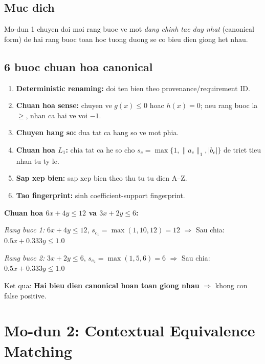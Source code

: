 \documentclass[11pt,a4paper]{article}
\begin{document}
\subsection{Muc dich}

Mo-dun 1 chuyen doi moi rang buoc ve mot \emph{dang chinh tac duy nhat}
(canonical form) de hai rang buoc toan hoc tuong duong se co bieu dien giong het nhau.

\subsection{6 buoc chuan hoa canonical}

\begin{enumerate}
  \item \textbf{Deterministic renaming:} doi ten bien theo provenance/requirement ID.
  \item \textbf{Chuan hoa sense:} chuyen ve $g(x) \leq 0$ hoac $h(x) = 0$;
        neu rang buoc la $\geq$, nhan ca hai ve voi $-1$.
  \item \textbf{Chuyen hang so:} dua tat ca hang so ve mot phia.
  \item \textbf{Chuan hoa $L_1$:} chia tat ca he so cho
        $s_c = \max\{1, \|a_c\|_1, |b_c|\}$ de triet tieu nhan tu ty le.
  \item \textbf{Sap xep bien:} sap xep bien theo thu tu tu dien A--Z.
  \item \textbf{Tao fingerprint:} sinh coefficient-support fingerprint.
\end{enumerate}

\begin{example}
\textbf{Chuan hoa $6x + 4y \leq 12$ va $3x + 2y \leq 6$:}

\textit{Rang buoc 1:} $6x + 4y \leq 12$, \quad $s_{c_1} = \max(1, 10, 12) = 12$
$\Rightarrow$ Sau chia: $0.5x + 0.333y \leq 1.0$

\textit{Rang buoc 2:} $3x + 2y \leq 6$, \quad $s_{c_2} = \max(1, 5, 6) = 6$
$\Rightarrow$ Sau chia: $0.5x + 0.333y \leq 1.0$

Ket qua: \textbf{Hai bieu dien canonical hoan toan giong nhau} $\Rightarrow$ khong con false positive.
\end{example}

\section{Mo-dun 2: Contextual Equivalence Matching}
\end{document}
